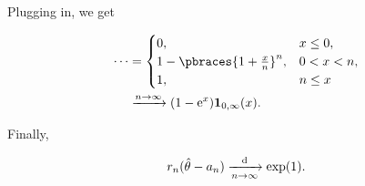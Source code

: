 \begin{solution}
\begin{enumerate}[label = (\alph*)]
    Plugging in, we get

    \begin{align*}
        \cdots
        & =
        \begin{cases}
            0,
            & x \leq 0, \\
            1 - \pbraces{1 + \frac{x}{n}}^n,
            & 0 < x < n, \\
            1,
            & n \leq x
        \end{cases} \\
        & \xrightarrow{n \to \infty}
        (1 - \mathrm e^x) \mathbf 1_{0, \infty}(x).
    \end{align*}

    Finally,

    \begin{align*}
        r_n (\hat \theta - a_n)
        \xrightarrow[n \to \infty]{\text d}
        \exp(1).
    \end{align*}

\end{enumerate}

\end{solution}

